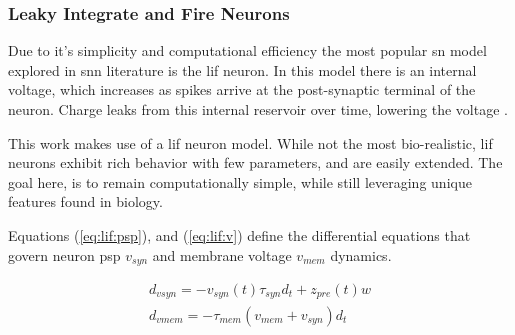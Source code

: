 \documentclass[conference]{IEEEtran}
\newcommand{\eq}[1]{Equation (\ref{#1})}
\begin{document}
\subsubsection{Leaky Integrate and Fire Neurons}
Due to it's simplicity and computational efficiency the most popular \gls{sn}
model explored in \gls{snn} literature is the \gls{lif} neuron. In this model
there is an internal voltage, which increases as spikes arrive at the
post-synaptic terminal of the neuron. Charge leaks from this internal reservoir
over time, lowering the voltage \parencite{izhikevich_2004}.






This work makes use of a \gls{lif} neuron model. While not the most
bio-realistic, \gls{lif} neurons exhibit rich behavior with few parameters, and
are easily extended. The goal here, is to remain computationally simple, while
still leveraging unique features found in biology.

Equations (\ref{eq:lif:psp}), and (\ref{eq:lif:v}) define the differential equations that
govern neuron \gls{psp} $v_{syn}$ and membrane voltage $v_{mem}$
dynamics.

\begin{align}
d_{vsyn} = -v_{syn}(t) \tau_{syn} d_t + z_{pre}(t) w \label{eq:lif:psp} \\
d_{vmem} = -\tau_{mem} (v_{mem} + v_{syn}) d_t \label{eq:lif:v}
\end{align}
\end{document}
